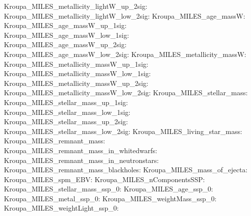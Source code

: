 Kroupa\_MILES\_metallicity\_lightW\_up\_2sig:  \newline 
Kroupa\_MILES\_metallicity\_lightW\_low\_2sig:  \newline 
Kroupa\_MILES\_age\_massW:  \newline 
Kroupa\_MILES\_age\_massW\_up\_1sig:  \newline 
Kroupa\_MILES\_age\_massW\_low\_1sig:  \newline 
Kroupa\_MILES\_age\_massW\_up\_2sig:  \newline 
Kroupa\_MILES\_age\_massW\_low\_2sig:  \newline 
Kroupa\_MILES\_metallicity\_massW:  \newline 
Kroupa\_MILES\_metallicity\_massW\_up\_1sig:  \newline 
Kroupa\_MILES\_metallicity\_massW\_low\_1sig:  \newline 
Kroupa\_MILES\_metallicity\_massW\_up\_2sig:  \newline 
Kroupa\_MILES\_metallicity\_massW\_low\_2sig:  \newline 
Kroupa\_MILES\_stellar\_mass:  \newline 
Kroupa\_MILES\_stellar\_mass\_up\_1sig:  \newline 
Kroupa\_MILES\_stellar\_mass\_low\_1sig:  \newline 
Kroupa\_MILES\_stellar\_mass\_up\_2sig:  \newline 
Kroupa\_MILES\_stellar\_mass\_low\_2sig:  \newline 
Kroupa\_MILES\_living\_star\_mass:  \newline 
Kroupa\_MILES\_remnant\_mass:  \newline 
Kroupa\_MILES\_remnant\_mass\_in\_whitedwarfs:  \newline 
Kroupa\_MILES\_remnant\_mass\_in\_neutronstars:  \newline 
Kroupa\_MILES\_remnant\_mass\_blackholes:  \newline 
Kroupa\_MILES\_mass\_of\_ejecta:  \newline 
Kroupa\_MILES\_spm\_EBV:  \newline 
Kroupa\_MILES\_nComponentsSSP:  \newline 
Kroupa\_MILES\_stellar\_mass\_ssp\_0:  \newline 
Kroupa\_MILES\_age\_ssp\_0:  \newline 
Kroupa\_MILES\_metal\_ssp\_0:  \newline 
Kroupa\_MILES\_weightMass\_ssp\_0:  \newline 
Kroupa\_MILES\_weightLight\_ssp\_0:  \newline 
